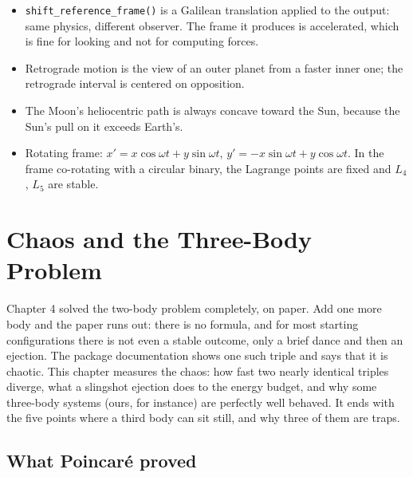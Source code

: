 \documentclass[
  10.5pt,
  letterpaper,
]{scrbook}
\providecommand{\tightlist}{%
  \setlength{\itemsep}{0pt}\setlength{\parskip}{0pt}}
\theoremstyle{plain}
\theoremstyle{remark}
\begin{document}
\begin{tcolorbox}[enhanced jigsaw, arc=.35mm, bottomrule=.15mm, bottomtitle=1mm, breakable, colback=white, colbacktitle=quarto-callout-tip-color!10!white, colframe=quarto-callout-tip-color-frame, coltitle=black, left=2mm, leftrule=.75mm, opacityback=0, opacitybacktitle=0.6, rightrule=.15mm, title={Key results}, titlerule=0mm, toprule=.15mm, toptitle=1mm]

\begin{itemize}
\tightlist
\item
  \texttt{shift\_reference\_frame()} is a Galilean translation applied
  to the output: same physics, different observer. The frame it produces
  is accelerated, which is fine for looking and not for computing
  forces.
\item
  Retrograde motion is the view of an outer planet from a faster inner
  one; the retrograde interval is centered on opposition.
\item
  The Moon's heliocentric path is always concave toward the Sun, because
  the Sun's pull on it exceeds Earth's.
\item
  Rotating frame: \(x' = x\cos\omega t + y\sin\omega t\),
  \(y' = -x\sin\omega t + y\cos\omega t\). In the frame co-rotating with
  a circular binary, the Lagrange points are fixed and \(L_4\), \(L_5\)
  are stable.
\end{itemize}

\end{tcolorbox}

\chapter{Chaos and the Three-Body Problem}\label{sec-chaos}

Chapter 4 solved the two-body problem completely, on paper. Add one more
body and the paper runs out: there is no formula, and for most starting
configurations there is not even a stable outcome, only a brief dance
and then an ejection. The package documentation shows one such triple
and says that it is chaotic. This chapter measures the chaos: how fast
two nearly identical triples diverge, what a slingshot ejection does to
the energy budget, and why some three-body systems (ours, for instance)
are perfectly well behaved. It ends with the five points where a third
body can sit still, and why three of them are traps.

\section{What Poincaré proved}\label{what-poincaruxe9-proved}
\end{document}
